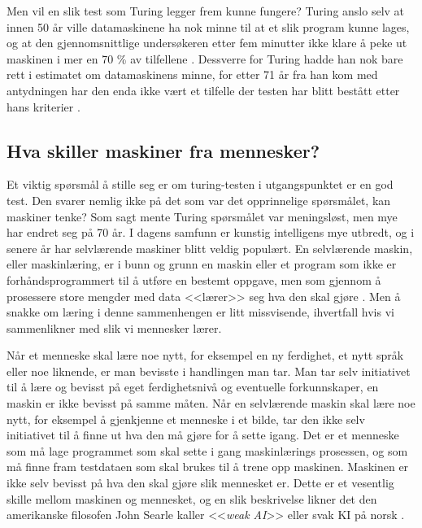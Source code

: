 Men vil en slik test som Turing legger frem kunne fungere? Turing anslo selv at innen 50 år ville datamaskinene ha nok minne til at et slik program kunne lages,
og at den gjennomsnittlige undersøkeren etter fem minutter ikke klare å peke ut maskinen i mer en 70 \% av tilfellene \autocite[442]{Turing1950}. 
Dessverre for Turing hadde han nok bare rett i estimatet om datamaskinens minne, for etter 71 år fra han kom med antydningen har den enda ikke vært et tilfelle der testen har blitt bestått etter hans kriterier \autocites[5]{Kiran2013}[]{turingTest}.

\subsection{Hva skiller maskiner fra mennesker?}

Et viktig spørsmål å stille seg er om turing-testen i utgangspunktet er en god test. 
Den svarer nemlig ikke på det som var det opprinnelige spørsmålet, kan maskiner tenke? 
Som sagt mente Turing spørsmålet var meningsløst, men mye har endret seg på 70 år. 
I dagens samfunn er kunstig intelligens mye utbredt, og i senere år har selvlærende maskiner blitt veldig populært.
En selvlærende maskin, eller maskinlæring, er i bunn og grunn en maskin eller et program som ikke er forhåndsprogrammert til å utføre en bestemt oppgave, 
men som gjennom å prosessere store mengder med data <<lærer>> seg hva den skal gjøre \autocite[3]{Kiran2013}. Men å snakke om læring i denne sammenhengen er litt missvisende, ihvertfall hvis vi sammenlikner med slik vi mennesker lærer. 

Når et menneske skal lære noe nytt, for eksempel en ny ferdighet, et nytt språk eller noe liknende, er man bevisste i handlingen man tar. 
Man tar selv initiativet til å lære og bevisst på eget ferdighetsnivå og eventuelle forkunnskaper, en maskin er ikke bevisst på samme måten. 
Når en selvlærende maskin skal lære noe nytt, for eksempel å gjenkjenne et menneske i et bilde, tar den ikke selv initiativet til å finne ut hva den må gjøre for å sette igang. 
Det er et menneske som må lage programmet som skal sette i gang maskinlærings prosessen, 
og som må finne fram testdataen som skal brukes til å trene opp maskinen. 
Maskinen er ikke selv bevisst på hva den skal gjøre slik mennesket er. 
Dette er et vesentlig skille mellom maskinen og mennesket, 
og en slik beskrivelse likner det den amerikanske filosofen John Searle kaller <<\textit{weak AI}>> eller svak KI på norsk \autocite[9]{Kiran2013}.

